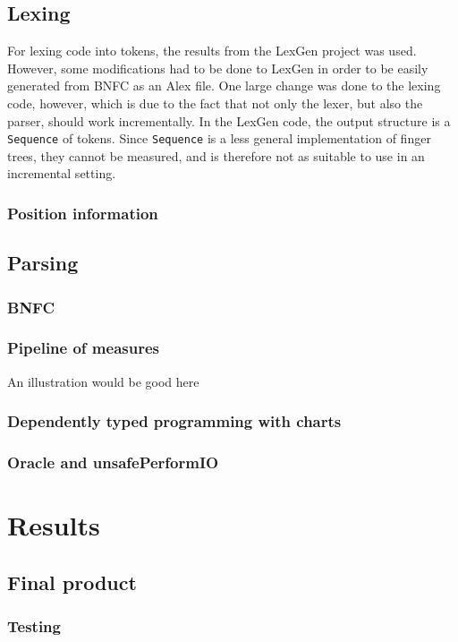 \documentclass[a4paper,12pt,twosided]{report}
\begin{document}
\section{Lexing}
For lexing code into tokens, the results from the LexGen project was used.
However, some modifications had to be done to LexGen in order to be easily
generated from BNFC as an Alex file. One large change was done to the lexing
code, however, which is due to the fact that not only the lexer, but also the
parser, should work incrementally. In the LexGen code, the output structure is a
\texttt{Sequence} of tokens. Since \texttt{Sequence} is a less general
implementation of finger trees, they cannot be measured, and is therefore not as
suitable to use in an incremental setting.

\subsection{Position information}

\section{Parsing}
\subsection{BNFC}
\subsection{Pipeline of measures}
    An illustration would be good here
\subsection{Dependently typed programming with charts}
\subsection{Oracle and unsafePerformIO}

%
%

\chapter{Results}

\section{Final product}
\subsection{Testing}
\end{document}
